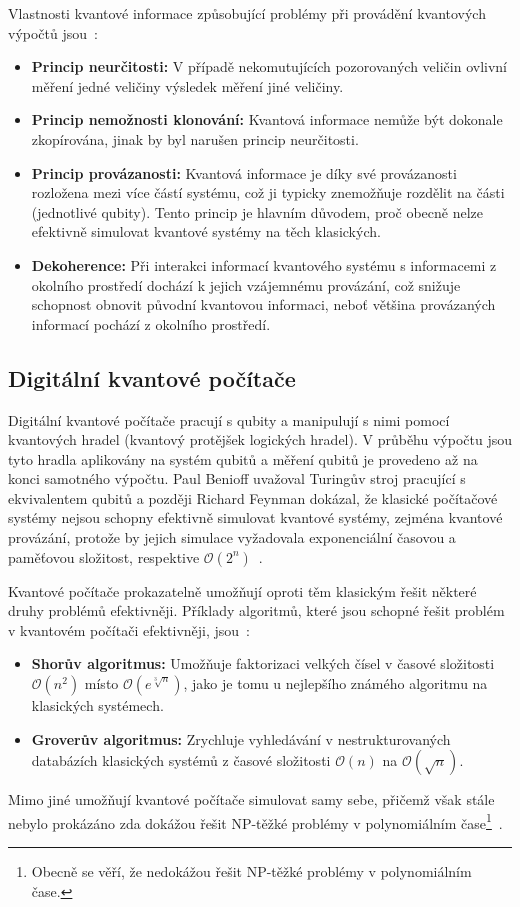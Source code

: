 Vlastnosti kvantové informace způsobující problémy při provádění kvantových výpočtů jsou~\cite{NaturalComputing}:
\begin{itemize}
    \item \textbf{Princip neurčitosti:} V případě nekomutujících pozorovaných veličin ovlivní měření jedné veličiny výsledek měření jiné veličiny. 
    \item \textbf{Princip nemožnosti klonování:} Kvantová informace nemůže být dokonale zkopírována, jinak by byl narušen princip neurčitosti. 
    \item \textbf{Princip provázanosti:} Kvantová informace je díky své provázanosti rozložena mezi více částí systému, což ji typicky znemožňuje rozdělit na části (jednotlivé qubity). Tento princip je hlavním důvodem, proč obecně nelze efektivně simulovat kvantové systémy na těch klasických. 
    \item \textbf{Dekoherence:} Při interakci informací kvantového systému s informacemi z okolního prostředí dochází k jejich vzájemnému provázání, což snižuje schopnost obnovit původní kvantovou informaci, neboť většina provázaných informací pochází z okolního prostředí. 
\end{itemize}

\subsection{Digitální kvantové počítače}
Digitální kvantové počítače pracují s qubity a manipulují s nimi pomocí kvantových hradel (kvantový protějšek logických hradel).
V průběhu výpočtu jsou tyto hradla aplikovány na systém qubitů a měření qubitů je provedeno až na konci samotného výpočtu. 
Paul Benioff uvažoval Turingův stroj pracující s ekvivalentem qubitů a později Richard Feynman dokázal, že klasické počítačové systémy nejsou schopny efektivně simulovat kvantové systémy, zejména kvantové provázání, protože by jejich simulace vyžadovala exponenciální časovou a paměťovou složitost, respektive $\mathcal{O}\left( 2^n \right)$~\cite{NaturalComputing,QuantumComuting-Introduction}. 

Kvantové počítače prokazatelně umožňují oproti těm klasickým řešit některé druhy problémů efektivněji. 
Příklady algoritmů, které jsou schopné řešit problém v kvantovém počítači efektivněji, jsou~\cite{NaturalComputing}: 
\begin{itemize}
    \item \textbf{Shorův algoritmus:} Umožňuje faktorizaci velkých čísel v časové složitosti $\mathcal{O}\left( n^2 \right)$ místo $\mathcal{O}\left(e^{\sqrt[3]{n}} \right)$, jako je tomu u nejlepšího známého algoritmu na klasických systémech.
    \item \textbf{Groverův algoritmus:} Zrychluje vyhledávání v nestrukturovaných databázích klasických systémů z časové složitosti $\mathcal{O}\left( n \right)$ na $\mathcal{O}\left( \sqrt{n} \right)$. 
\end{itemize}
Mimo jiné umožňují kvantové počítače simulovat samy sebe, přičemž však stále nebylo prokázáno zda dokážou řešit NP-těžké problémy v polynomiálním čase\footnote{Obecně se věří, že nedokážou řešit NP-těžké problémy v polynomiálním čase.}~\cite{NaturalComputing}. 

